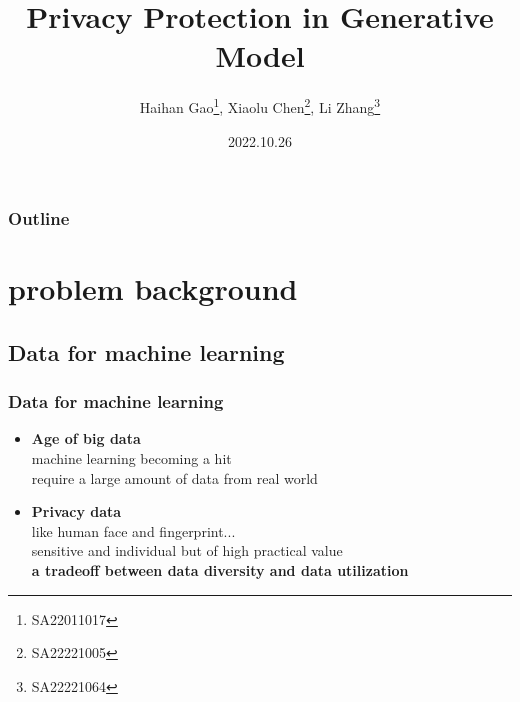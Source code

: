 \documentclass{beamer}
\title{Privacy Protection in Generative Model}
\author{Haihan Gao\thanks{SA22011017}, Xiaolu Chen\thanks{SA22221005}, Li Zhang\thanks{SA22221064}}
\institute{University of Science and Technology of China}
\date {2022.10.26}
\begin{document}
\begin{frame}
\titlepage
\end{frame}



\begin{frame}
	\frametitle{Outline}
  \renewcommand{\contentsname}{目录}
\tableofcontents
\end{frame}
\section{problem background}
\subsection{Data for machine learning}
\begin{frame}
    \frametitle{Data for machine learning}
    \begin{itemize}
        \item \textbf{Age of big data}\\[5pt]
        machine learning becoming a hit\\
        require a large amount of data from real world\\[20pt]
        \item \textbf{Privacy data}\\[5pt]
        like human face and fingerprint...\\
        sensitive and individual but of high practical value\\
        \textbf{a tradeoff between data diversity and data utilization}
    \end{itemize}
\end{frame}
\end{document}
